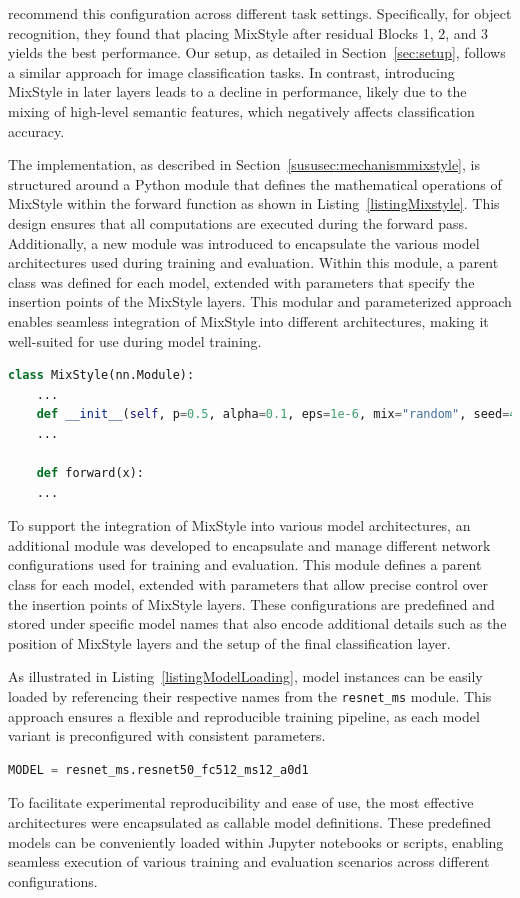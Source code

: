\cite{zhouMixStyleNeuralNetworks2023} recommend this configuration across different task settings. Specifically, for object recognition, they found that placing MixStyle after residual Blocks 1, 2, and 3 yields the best performance. Our setup, as detailed in Section~\ref{sec:setup}, follows a similar approach for image classification tasks. In contrast, introducing MixStyle in later layers leads to a decline in performance, likely due to the mixing of high-level semantic features, which negatively affects classification accuracy.

The implementation, as described in Section~\ref{sususec:mechanismmixstyle}, is structured around a Python module that defines the mathematical operations of MixStyle within the forward function as shown in Listing~\ref{listingMixstyle}. This design ensures that all computations are executed during the forward pass. Additionally, a new module was introduced to encapsulate the various model architectures used during training and evaluation. Within this module, a parent class was defined for each model, extended with parameters that specify the insertion points of the MixStyle layers. This modular and parameterized approach enables seamless integration of MixStyle into different architectures, making it well-suited for use during model training.

\begin{lstlisting}[language=Python, caption={MixStyle implementation structure}, label=listingMixstyle]
class MixStyle(nn.Module):
	...
	def __init__(self, p=0.5, alpha=0.1, eps=1e-6, mix="random", seed=42):
	...
	
	def forward(x):
	...
\end{lstlisting}

To support the integration of MixStyle into various model architectures, an additional module was developed to encapsulate and manage different network configurations used for training and evaluation. This module defines a parent class for each model, extended with parameters that allow precise control over the insertion points of MixStyle layers. These configurations are predefined and stored under specific model names that also encode additional details such as the position of MixStyle layers and the setup of the final classification layer.

As illustrated in Listing~\ref{listingModelLoading}, model instances can be easily loaded by referencing their respective names from the \texttt{resnet\_ms} module. This approach ensures a flexible and reproducible training pipeline, as each model variant is preconfigured with consistent parameters.

\begin{lstlisting}[language=Python, caption={Model loading from predefined configurations}, label=listingModelLoading]
	MODEL = resnet_ms.resnet50_fc512_ms12_a0d1
\end{lstlisting}

To facilitate experimental reproducibility and ease of use, the most effective architectures were encapsulated as callable model definitions. These predefined models can be conveniently loaded within Jupyter notebooks or scripts, enabling seamless execution of various training and evaluation scenarios across different configurations. 
